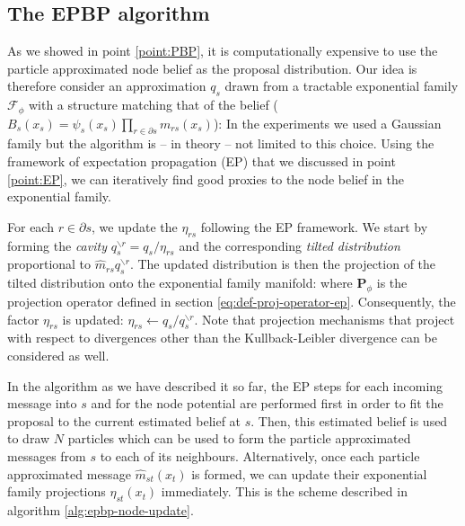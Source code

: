 \subsection{The EPBP algorithm}
As we showed in point \ref{point:PBP}, it is computationally expensive to use the particle approximated node belief as the proposal distribution. 
Our idea is therefore consider an approximation $q_{s}$ drawn from a tractable exponential family $\mathcal F_{\phi}$ with a structure matching that of the belief ($B_{s}(x_{s}) = \psi_{s}(x_{s})\prod_{r\in\partial s} m_{rs}(x_{s})$):
%
%
In the experiments we used a Gaussian family but the algorithm is -- in theory  -- not limited to this choice.
Using the framework of expectation propagation (EP) that we discussed in point \ref{point:EP}, we can iteratively find good proxies to the node belief in the exponential family.

For each $r\in\partial s$, we update the $\eta_{rs}$ following the EP framework. We start by forming the \emph{cavity} $q^{\backslash r}_{s}=q_{s}/\eta_{rs}$ and the corresponding \emph{tilted distribution} proportional to $\widehat m_{rs} q_{s}^{\backslash r}$.  The updated distribution is then the projection of the tilted distribution onto the exponential family manifold:
where $\mathbf P_{\phi}$ is the projection operator defined in section \ref{eq:def-proj-operator-ep}. Consequently, the factor $\eta_{rs}$ is updated: $\eta_{rs} \leftarrow  q_{s}/ q_{s}^{\backslash r}$. Note that projection mechanisms that project with respect to divergences other than the Kullback-Leibler divergence can be considered as well. 

In the algorithm as we have described it so far, the EP steps for each incoming message into $s$ and for the node potential are performed first in order to fit the proposal to the current estimated belief at $s$. Then, this estimated belief is used to draw $N$ particles which can be used to form the particle approximated messages from $s$ to each of its neighbours. 
Alternatively, once each particle approximated message $\widehat{m}_{st}(x_t)$ is formed, we can update their exponential family projections $\eta_{st}(x_t)$ immediately. This is the scheme described in algorithm \ref{alg:epbp-node-update}.

